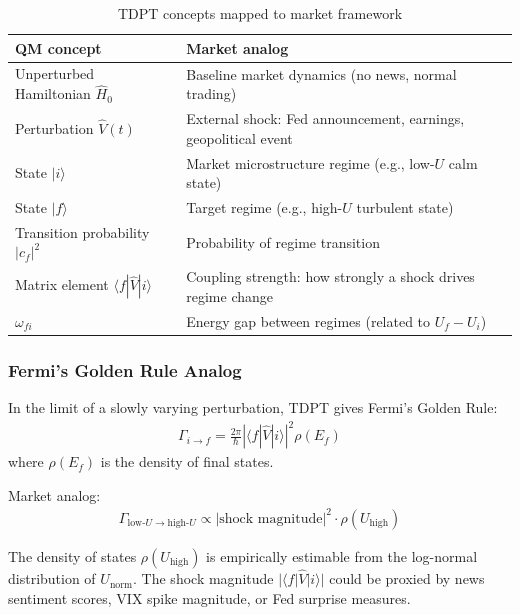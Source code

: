 \documentclass[11pt]{article}
\begin{document}
\begin{table}[htbp]
\centering
\caption{TDPT concepts mapped to market framework}
\begin{tabular}{ll}
\toprule
QM concept & Market analog \\
\midrule
Unperturbed Hamiltonian $\hat{H}_0$     & Baseline market dynamics (no news, normal trading) \\
Perturbation $\hat{V}(t)$               & External shock: Fed announcement, earnings, geopolitical event \\
State $|i\rangle$                       & Market microstructure regime (e.g., low-$U$ calm state) \\
State $|f\rangle$                       & Target regime (e.g., high-$U$ turbulent state) \\
Transition probability $|c_f|^2$        & Probability of regime transition \\
Matrix element $\langle f|\hat{V}|i\rangle$ & Coupling strength: how strongly a shock drives regime change \\
$\omega_{fi}$                           & Energy gap between regimes (related to $U_f - U_i$) \\
\bottomrule
\end{tabular}
\end{table}

\subsubsection{Fermi's Golden Rule Analog}

In the limit of a slowly varying perturbation, TDPT gives Fermi's Golden Rule:
\begin{align}
    \Gamma_{i \to f} = \frac{2\pi}{\hbar} \left| \langle f | \hat{V} | i \rangle \right|^2 \rho(E_f)
\end{align}
where $\rho(E_f)$ is the density of final states.

Market analog:
\begin{align}
    \Gamma_{\mathrm{low}\text{-}U \to \mathrm{high}\text{-}U} \propto |\text{shock magnitude}|^2 \cdot \rho(U_{\mathrm{high}})
\end{align}

The density of states $\rho(U_{\mathrm{high}})$ is empirically estimable from the log-normal distribution of $U_\mathrm{norm}$. The shock magnitude $|\langle f|\hat{V}|i\rangle|$ could be proxied by news sentiment scores, VIX spike magnitude, or Fed surprise measures.
\end{document}
